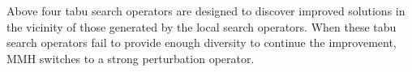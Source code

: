 \documentclass[12pt, a4paper]{article}%
\DeclareMathOperator*{\opt}{\ensuremath{opt}}
\newcommand{\randn}{\ensuremath{\mathrm{randn}}}
\numberwithin{equation}{section}
\theoremstyle{plain}
\begin{document}
			Above four tabu search operators are designed to discover improved solutions in the vicinity of those generated by the local search operators. When these tabu search operators fail to provide enough diversity to continue the improvement, MMH switches to a strong perturbation operator.
			
\end{document}
